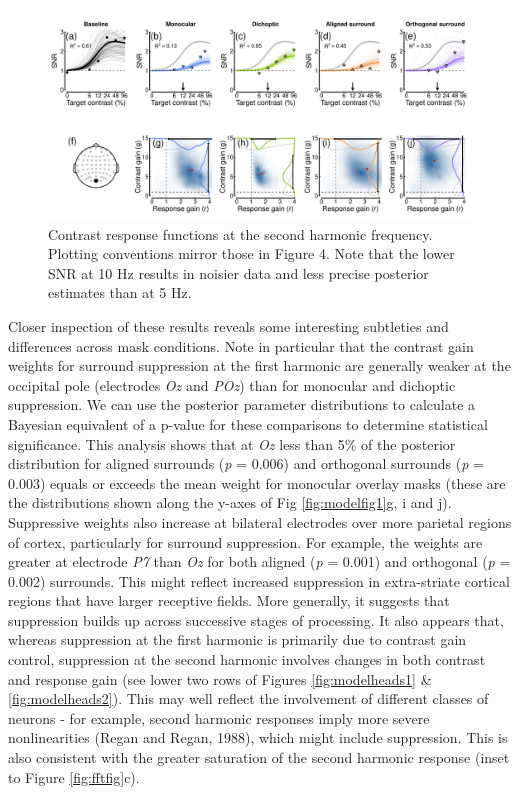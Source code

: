 \documentclass[]{article}
\begin{document}
\begin{figure}

{\centering \includegraphics{figures/modelfig2} 

}

\caption{Contrast response functions at the second harmonic frequency. Plotting conventions mirror those in Figure 4. Note that the lower SNR at 10 Hz results in noisier data and less precise posterior estimates than at 5 Hz.}\label{fig:modelfig2}
\end{figure}

Closer inspection of these results reveals some interesting subtleties and differences across mask conditions. Note in particular that the contrast gain weights for surround suppression at the first harmonic are generally weaker at the occipital pole (electrodes \emph{Oz} and \emph{POz}) than for monocular and dichoptic suppression. We can use the posterior parameter distributions to calculate a Bayesian equivalent of a p-value for these comparisons to determine statistical significance. This analysis shows that at \emph{Oz} less than 5\% of the posterior distribution for aligned surrounds (\emph{p} = 0.006) and orthogonal surrounds (\emph{p} = 0.003) equals or exceeds the mean weight for monocular overlay masks (these are the distributions shown along the y-axes of Fig \ref{fig:modelfig1}g, i and j). Suppressive weights also increase at bilateral electrodes over more parietal regions of cortex, particularly for surround suppression. For example, the weights are greater at electrode \emph{P7} than \emph{Oz} for both aligned (\emph{p} = 0.001) and orthogonal (\emph{p} = 0.002) surrounds. This might reflect increased suppression in extra-striate cortical regions that have larger receptive fields. More generally, it suggests that suppression builds up across successive stages of processing. It also appears that, whereas suppression at the first harmonic is primarily due to contrast gain control, suppression at the second harmonic involves changes in both contrast and response gain (see lower two rows of Figures \ref{fig:modelheads1} \& \ref{fig:modelheads2}). This may well reflect the involvement of different classes of neurons - for example, second harmonic responses imply more severe nonlinearities (Regan and Regan, 1988), which might include suppression. This is also consistent with the greater saturation of the second harmonic response (inset to Figure \ref{fig:fftfig}c).
\end{document}
